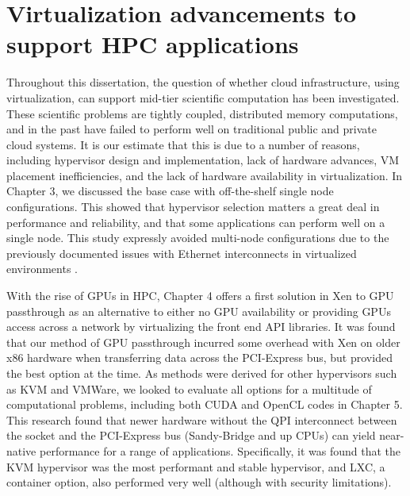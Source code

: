 
\chapter{Virtualization advancements to support HPC applications}
\label{chap:future-work}

Throughout this dissertation, the question of whether cloud infrastructure, using virtualization, can support mid-tier scientific computation has been investigated. These scientific problems are tightly coupled, distributed memory computations, and in the past have failed to perform well on traditional public and private cloud systems. It is our estimate that this is due to a number of reasons, including hypervisor design and implementation, lack of hardware advances, VM placement inefficiencies, and the lack of hardware availability in virtualization. In Chapter 3, we discussed the base case with off-the-shelf single node configurations.  This showed that hypervisor selection matters a great deal in performance and reliability, and that some applications can perform well on a single node. This study expressly avoided multi-node configurations due to the previously documented issues with Ethernet interconnects in virtualized environments \cite{MagellanFinal}. 

With the rise of GPUs in HPC, Chapter 4 offers a first solution in Xen to GPU passthrough as an alternative to either no GPU availability or providing GPUs access across a network by virtualizing the front end API libraries. It was found that our method of GPU passthrough incurred some overhead with Xen on older x86 hardware when transferring data across the PCI-Express bus, but provided the best option at the time.  As methods were derived for other hypervisors such as KVM and VMWare, we looked to evaluate all options for a multitude of computational problems, including both CUDA and OpenCL codes in Chapter 5. This research found that newer hardware without the QPI interconnect between the socket and the PCI-Express bus (Sandy-Bridge and up CPUs) can yield near-native performance for a range of applications.  Specifically, it was found that the KVM hypervisor was the most performant and stable hypervisor, and LXC, a container option, also performed very well (although with security limitations).  

